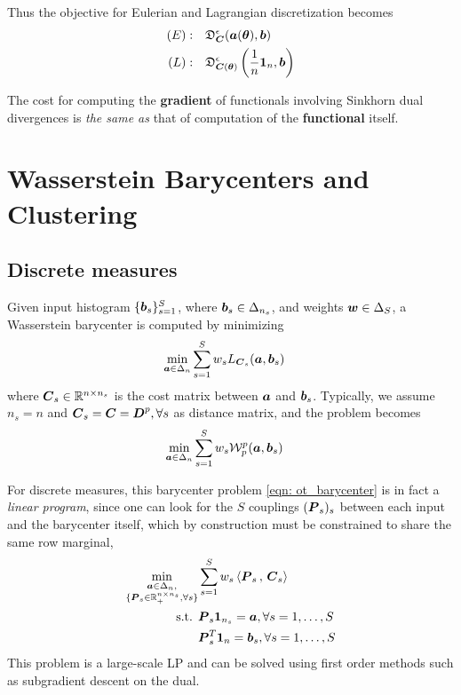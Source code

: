 \documentclass[11pt]{article}
\begin{document}
Thus the objective for Eulerian and Lagrangian discretization becomes
\begin{align*}
(E):&\quad \mathfrak{D}_{\boldsymbol{C}}^{\epsilon}(\boldsymbol{a}(\boldsymbol{\theta}), \boldsymbol{b}) \\
(L):&\quad \mathfrak{D}_{\boldsymbol{C}(\boldsymbol{\theta})}^{\epsilon}\left(\frac{1}{n}\boldsymbol{1}_{n}, \boldsymbol{b}\right)
\end{align*}

The cost for computing the \textbf{gradient} of functionals involving Sinkhorn dual divergences is \emph{the same as} that of computation of the \textbf{functional} itself.

\section{Wasserstein Barycenters and Clustering}
\subsection{Discrete measures}
Given input histogram $\{\boldsymbol{b}_s\}_{s=1}^{S}$, where $\boldsymbol{b}_s \in \Delta_{n_s}$, and weights $\boldsymbol{w} \in \Delta_{S}$, a Wasserstein barycenter is computed by minimizing
\begin{align}
\min_{\boldsymbol{a} \in \Delta_{n}}& \sum_{s=1}^{S}w_{s}L_{\boldsymbol{C}_{s}}(\boldsymbol{a}, \boldsymbol{b}_{s}) \label{eqn: ot_barycenter}
\end{align} where $\boldsymbol{C}_{s} \in {\mathbb R}^{n \times n_s}$ is the cost matrix between $\boldsymbol{a}$ and $\boldsymbol{b}_{s}$. Typically, we assume $n_{s} = n$ and $\boldsymbol{C}_s = \boldsymbol{C} = \boldsymbol{D}^{p}, \forall s$ as distance matrix, and the problem becomes
\begin{align*}
\min_{\boldsymbol{a} \in \Delta_{n}}& \sum_{s=1}^{S}w_{s}{\mathcal W}_{p}^{p}(\boldsymbol{a}, \boldsymbol{b}_{s})
\end{align*}

For discrete measures, this barycenter problem \eqref{eqn: ot_barycenter} is in fact a \emph{linear program}, since one can look for the $S$ couplings $(\boldsymbol{P}_s)_s$ between each input and the barycenter itself, which by construction must be constrained to share the same row marginal,
\begin{align*}
\min_{\substack{\boldsymbol{a} \in \Delta_{n},\\ \{\boldsymbol{P}_{s}\in {\mathbb R}_{+}^{n\times n_s}, \forall s\}}}& \sum_{s=1}^{S}w_{s} \left\langle \boldsymbol{P}_{s}\,,\, \boldsymbol{C}_{s} \right\rangle \\
\text{s.t. }& \boldsymbol{P}_{s}\boldsymbol{1}_{n_s} = \boldsymbol{a}, \forall s=1,\ldots, S\\
&\boldsymbol{P}_{s}^{T}\boldsymbol{1}_{n} = \boldsymbol{b}_{s}, \forall s=1,\ldots, S
\end{align*} This problem is a large-scale LP and can be solved using first order methods such as subgradient descent on the dual.
\end{document}
